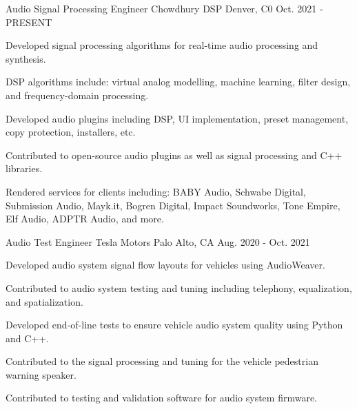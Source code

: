 

\begin{cventries}

  \cventry
    {Audio Signal Processing Engineer} %
    {Chowdhury DSP} %
    {Denver, C0} %
    {Oct. 2021 - PRESENT} %
    {
      \begin{cvitems} %
        \item {Developed signal processing algorithms for real-time audio processing and synthesis.}
        \item {DSP algorithms include: virtual analog modelling, machine learning, filter design, and frequency-domain processing.}
        \item {Developed audio plugins including DSP, UI implementation, preset management, copy protection, installers, etc.}
        \item {Contributed to open-source audio plugins as well as signal processing and C++ libraries.}
        \item {Rendered services for clients including: BABY Audio, Schwabe Digital, Submission Audio, Mayk.it, Bogren Digital,
               Impact Soundworks, Tone Empire, Elf Audio, ADPTR Audio, and more.}
      \end{cvitems}
    }

  \cventry
    {Audio Test Engineer} %
    {Tesla Motors} %
    {Palo Alto, CA} %
    {Aug. 2020 - Oct. 2021} %
    {
      \begin{cvitems} %
        \item {Developed audio system signal flow layouts for vehicles using AudioWeaver.}
        \item {Contributed to audio system testing and tuning including telephony, equalization, and spatialization.}
        \item {Developed end-of-line tests to ensure vehicle audio system quality using Python and C++.}
        \item {Contributed to the signal processing and tuning for the vehicle pedestrian warning speaker.}
        \item {Contributed to testing and validation software for audio system firmware.}
      \end{cvitems}
    }


\end{cventries}
